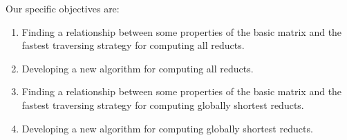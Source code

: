 \documentclass[authoryear,11pt]{elsarticle}
\begin{document}
  Our specific objectives are:
  \begin{enumerate}
  \item Finding a relationship between some properties of the basic matrix and the fastest 
  		traversing strategy for computing all reducts.
  		  	
  		
  
  \item Developing a new algorithm for computing all reducts.
  		
  \item Finding a relationship between some properties of the basic matrix and the fastest 
  		traversing strategy for computing globally shortest reducts.
  		  	
  		
  
  \item Developing a new algorithm for computing globally shortest reducts.
%  
  \end{enumerate}
\end{document}
